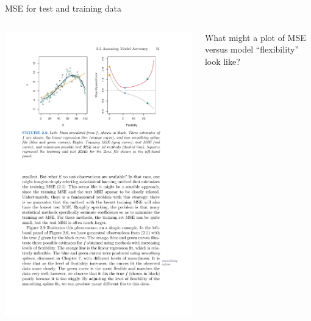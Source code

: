 \documentclass[aspectratio=169, handout]{beamer}
\begin{document}
\begin{frame}{MSE for test and training data}


\begin{columns}


\includegraphics[scale=1]{figures/islr2_9a.pdf}


What might a plot of MSE versus model ``flexibility'' look like?




\end{columns}
\end{frame}
\end{document}
